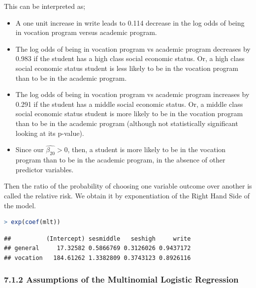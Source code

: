 \documentclass[
]{article}
\begin{document}
This can be interpreted as;

\begin{itemize}
\item
  A one unit increase in write leads to 0.114 decrease in the log odds
  of being in vocation program versus academic program.
\item
  The log odds of being in vocation program vs academic program
  decreases by 0.983 if the student has a high class social economic
  status. Or, a high class social economic status student is less likely
  to be in the vocation program than to be in the academic program.
\item
  The log odds of being in vocation program vs academic program
  increases by 0.291 if the student has a middle social economic status.
  Or, a middle class social economic status student is more likely to be
  in the vocation program than to be in the academic program (although
  not statistically significant looking at its p-value).
\item
  Since our \(\hat{\beta_{20}}>0\), then, a student is more likely to be
  in the vocation program than to be in the academic program, in the
  absence of other predictor variables.
\end{itemize}

Then the ratio of the probability of choosing one variable outcome over
another is called the relative risk. We obtain it by exponentiation of
the Right Hand Side of the model.

\begin{lstlisting}[language=R]
> exp(coef(mlt))
\end{lstlisting}

\begin{lstlisting}
##          (Intercept) sesmiddle   seshigh     write
## general     17.32582 0.5866769 0.3126026 0.9437172
## vocation   184.61262 1.3382809 0.3743123 0.8926116
\end{lstlisting}

\hypertarget{assumptions-of-the-multinomial-logistic-regression}{%
\subsubsection{7.1.2 Assumptions of the Multinomial Logistic
Regression}\label{assumptions-of-the-multinomial-logistic-regression}}
\end{document}
